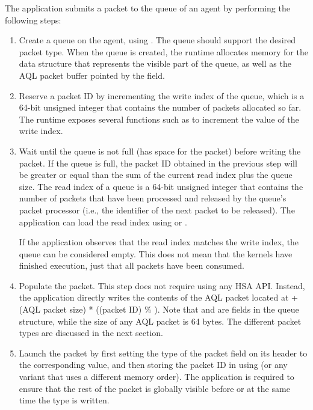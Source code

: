 \documentclass[oneside]{book}
\begin{document}
The application submits a packet to the queue of an agent by performing the
following steps:
\begin{enumerate}[itemsep=1pt,topsep=3pt,partopsep=0pt]

\item Create a queue on the agent, using . The queue
  should support the desired packet type. When the queue is created, the runtime
  allocates memory for the  data structure that represents
  the visible part of the queue, as well as the AQL packet buffer pointed by the
   field.

\item Reserve a packet ID by incrementing the write index of the queue, which is
  a 64-bit unsigned integer that contains the number of packets allocated so
  far. The runtime exposes several functions such as
   to increment the value of the write
  index.

\item Wait until the queue is not full (has space for the packet) before writing
the packet. If the queue is full, the packet ID obtained in the previous step
will be greater or equal than the sum of the current read index plus the queue
size. The read index of a queue is a 64-bit unsigned integer that contains the
number of packets that have been processed and released by the queue's packet
processor (i.e., the identifier of the next packet to be released). The
application can load the read index using
 or
.

  If the application observes that the read index matches the write index, the
  queue can be considered empty. This does not mean that the kernels have
  finished execution, just that all packets have been consumed.

\item Populate the packet. This step does not require using any HSA
  API. Instead, the application directly writes the contents of the AQL packet
  located at  + (AQL packet size) * ((packet
  ID) \% ). Note that 
  and  are fields in the queue structure, while the
  size of any AQL packet is 64 bytes. The different packet types are discussed
  in the next section.

\item Launch the packet by first setting the type of the packet field on its
  header to the corresponding value, and then storing the packet ID in
   using 
  (or any variant that uses a different memory order). The application is
  required to ensure that the rest of the packet is globally visible before or
  at the same time the type is written.


\end{enumerate}
\end{document}
